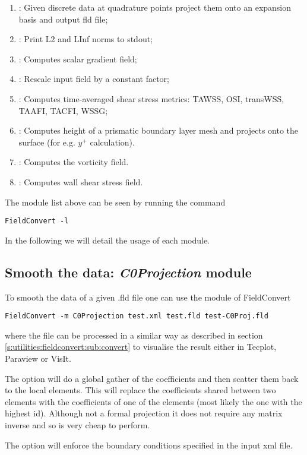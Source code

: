 \begin{enumerate}
\item {}: Given discrete data at quadrature points
  project them onto an expansion basis and output fld file; 
\item {}: Print L2 and LInf norms to stdout;
\item {}: Computes scalar gradient field;
\item {}: Rescale input field by a constant factor;
\item {}: Computes time-averaged shear stress metrics: TAWSS, OSI, transWSS, TAAFI, TACFI, WSSG;
\item {}: Computes height of a prismatic boundary layer mesh and projects onto the surface (for e.g. $y^+$ calculation).
\item {}: Computes the vorticity field.
\item {}: Computes wall shear stress field.
\end{enumerate}
The module list above can be seen by running the command
%
\begin{lstlisting}[style=BashInputStyle]
FieldConvert -l
\end{lstlisting}
%
In the following we will detail the usage of each module.
%
%
%

\subsection{Smooth the data: \textit{C0Projection} module}
To smooth the data of a given .fld file one can
use the  module of FieldConvert
%
\begin{lstlisting}[style=BashInputStyle]
FieldConvert -m C0Projection test.xml test.fld test-C0Proj.fld
\end{lstlisting}
%
where the file  can be processed in a similar
way as described in section \ref{s:utilities:fieldconvert:sub:convert}
to visualise the result either in Tecplot, Paraview or VisIt.

The option  will do a global gather of the
coefficients and then scatter them back to the local elements. This
will replace the coefficients shared between two elements with the
coefficients of one of the elements (most likely the one with the
highest id). Although not a formal projection it does not require any
matrix inverse and so is very cheap to perform.

The option  will enforce the boundary conditions
specified in the input xml file.

